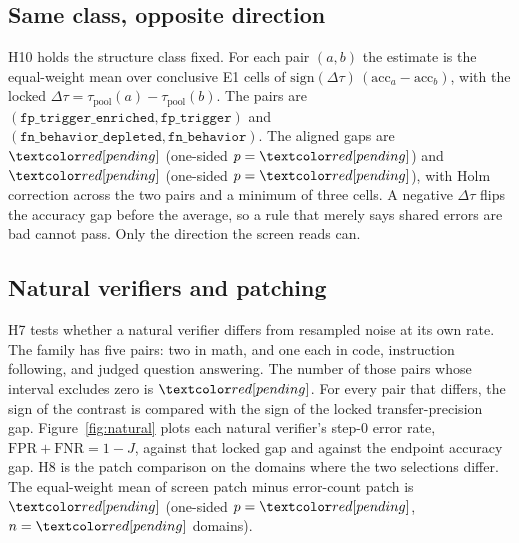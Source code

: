\begin{table}[t]
\caption{Baselines for the stage A accuracy gaps. $\rho$ is the baseline's Spearman correlation. The last column is where the number comes from. The note under the table is the break-even count of verifiers.}
\label{tab:baselines}
\centering
\small
\setlength{\tabcolsep}{4pt}

\end{table}

\subsection{Same class, opposite direction}
\label{sec:h10}

H10 holds the structure class fixed.
For each pair $(a, b)$ the estimate is the equal-weight mean over conclusive E1 cells of $\mathrm{sign}(\Delta\tau)\,(\mathrm{acc}_a - \mathrm{acc}_b)$, with the locked $\Delta\tau = \tau_{\mathrm{pool}}(a) - \tau_{\mathrm{pool}}(b)$.
The pairs are $(\texttt{fp\_trigger\_enriched}, \texttt{fp\_trigger})$ and $(\texttt{fn\_behavior\_depleted}, \texttt{fn\_behavior})$.
The aligned gaps are $\HTenTrigger{}$ (one-sided $p = \HTenTriggerP{}$) and $\HTenFn{}$ (one-sided $p = \HTenFnP{}$), with Holm correction across the two pairs and a minimum of three cells.
A negative $\Delta\tau$ flips the accuracy gap before the average, so a rule that merely says shared errors are bad cannot pass.
Only the direction the screen reads can.

\subsection{Natural verifiers and patching}
\label{sec:h7}

H7 tests whether a natural verifier differs from resampled noise at its own rate.
The family has five pairs: two in math, and one each in code, instruction following, and judged question answering.
The number of those pairs whose interval excludes zero is $\HSevenNDiff{}$.
For every pair that differs, the sign of the contrast is compared with the sign of the locked transfer-precision gap.
Figure~\ref{fig:natural} plots each natural verifier's step-0 error rate, $\mathrm{FPR} + \mathrm{FNR} = 1 - J$, against that locked gap and against the endpoint accuracy gap.
H8 is the patch comparison on the domains where the two selections differ.
The equal-weight mean of screen patch minus error-count patch is $\HEightPoint{}$ (one-sided $p = \HEightP{}$, $n = \HEightN{}$ domains).

